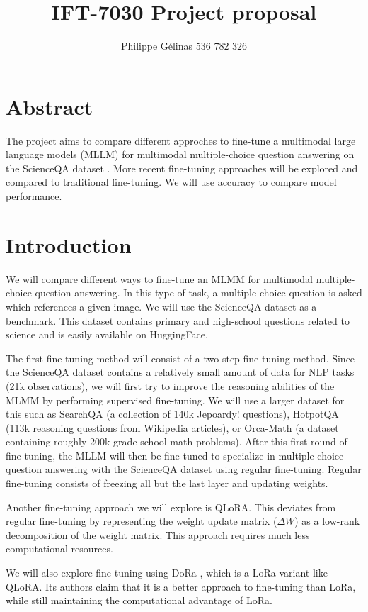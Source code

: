 \documentclass[11pt]{article} %
\title{IFT-7030 Project proposal}
\author{Philippe Gélinas 536 782 326}
\date{\vspace{-5ex}} %
\begin{document}
\maketitle

\section*{Abstract}
The project aims to compare different approches to fine-tune a multimodal large language models (MLLM) for multimodal multiple-choice question answering on the ScienceQA dataset \cite{ScienceQA}. More recent fine-tuning approaches will be explored and compared to traditional fine-tuning. We will use accuracy to compare model performance.

\section*{Introduction}
We will compare different ways to fine-tune an MLMM for multimodal multiple-choice question answering. In this type of task, a multiple-choice question is asked which references a given image. We will use the ScienceQA dataset as a benchmark. This dataset contains primary and high-school questions related to science and is easily available on HuggingFace.

The first fine-tuning method will consist of a two-step fine-tuning method. Since the ScienceQA dataset contains a relatively small amount of data for NLP tasks (21k observations), we will first try to improve the reasoning abilities of the MLMM by performing supervised fine-tuning. We will use a larger dataset for this such as SearchQA (a collection of 140k Jepoardy! questions), HotpotQA (113k reasoning questions from Wikipedia articles), or Orca-Math (a dataset containing roughly 200k grade school math problems). After this first round of fine-tuning, the MLLM will then be fine-tuned to specialize in multiple-choice question answering with the ScienceQA dataset using regular fine-tuning. Regular fine-tuning consists of freezing all but the last layer and updating weights.

Another fine-tuning approach we will explore is QLoRA. This deviates from regular fine-tuning by representing the weight update matrix ($\Delta W$) as a low-rank decomposition of the weight matrix. This approach requires much less computational resources.

We will also explore fine-tuning using DoRa \cite{dora}, which is a LoRa variant like QLoRA. Its authors claim that it is a better approach to fine-tuning than LoRa, while still maintaining the computational advantage of LoRa.
\end{document}
